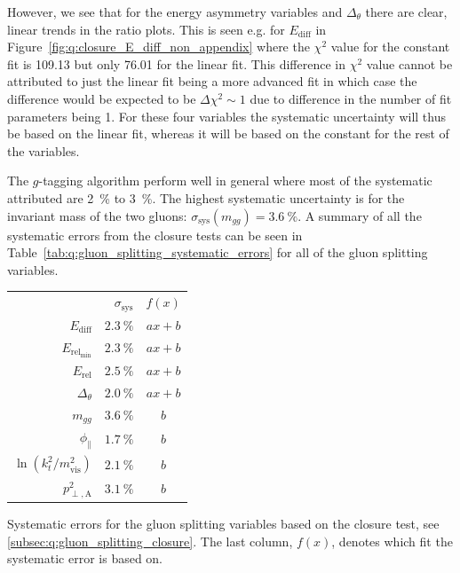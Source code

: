 However, we see that for the energy asymmetry variables and $\Delta_\theta$ there are clear, linear trends in the ratio plots. This is seen e.g. for $E_\mathrm{diff}$ in Figure~\ref{fig:q:closure_E_diff_non_appendix} where the $\chi^2$ value for the constant fit is \num{109.13} but only \num{76.01} for the linear fit. This difference in $\chi^2$ value cannot be attributed to just the linear fit being a more advanced fit in which case the difference would be expected to be $\Delta \chi^2 \sim 1$ due to difference in the number of fit parameters being \num{1}. For these four variables the systematic uncertainty will thus be based on the linear fit, whereas it will be based on the constant for the rest of the variables. 

The $g$-tagging algorithm perform well in general where most of the systematic attributed are \SI{2}{\percent} to \SI{3}{\percent}. The highest systematic uncertainty is for the invariant mass of the two gluons: $\sigma_\mathrm{sys}(m_{gg}) = \SI{3.6}{\percent}$. A summary of all the systematic errors from the closure tests can be seen in Table~\ref{tab:q:gluon_splitting_systematic_errors} for all of the gluon splitting variables. 

\begin{margintable}[-3cm]
  \centerfloat
  \begin{tabular}{@{}rrc@{}}
  {}                                                & $\sigma_\mathrm{sys}$& $f(x)$ \\ \addlinespace[0.1em] \midrule \addlinespace[0.2em]
  $E_\mathrm{diff}$                                 & $\SI{2.3}{\percent}$ & $ax+b$ \\ \addlinespace[0.2em]
  $E_{\mathrm{rel}_\mathrm{min}}$                   & $\SI{2.3}{\percent}$ & $ax+b$  \\\addlinespace[0.2em]
  $E_\mathrm{rel}$                                  & $\SI{2.5}{\percent}$ & $ax+b$  \\\addlinespace[0.2em]
  $\Delta_\theta$                                   & $\SI{2.0}{\percent}$ & $ax+b$  \\\addlinespace[0.2em]
  $m_{gg}$                                          & $\SI{3.6}{\percent}$ & $b$ \\\addlinespace[0.2em]
  $\phi_\mathrm{\parallel}$                         & $\SI{1.7}{\percent}$ & $b$  \\\addlinespace[0.2em]
  $\ln \left( k_t^2 / m_\mathrm{vis}^2 \right)$     & $\SI{2.1}{\percent}$ & $b$ \\\addlinespace[0.2em]
  $p^2_{\perp,\mathrm{A}}$                          & $\SI{3.1}{\percent}$ & $b$  \\ %
  \end{tabular}
  \vspace{3mm}
  \caption[Gluon Splitting Systematic Errors]{\label{tab:q:gluon_splitting_systematic_errors}Systematic errors for the gluon splitting variables based on the closure test, see \autoref{subsec:q:gluon_splitting_closure}.  The last column, $f(x)$, denotes which fit the systematic error is based on.}
\end{margintable}


